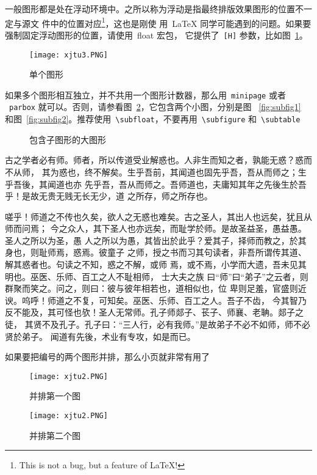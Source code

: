 \documentclass[%
               amsthm,
              ]{xjtubsc}
\begin{document}
一般图形都是处在浮动环境中。之所以称为浮动是指最终排版效果图形的位置不一定与源文
件中的位置对应\footnote{This is not a bug, but a feature of \LaTeX!}，这也是刚使
用~\LaTeX{} 同学可能遇到的问题。如果要强制固定浮动图形的位置，请使用~\textsf{float} 宏包，
它提供了~\texttt{[H]} 参数，比如图~\ref{fig:xfig1}。
\begin{figure}[H]
  \centering
  \texttt{[image: xjtu3.PNG]}
  \caption{单个图形}
  \label{fig:xfig1}
\end{figure}
如果多个图形相互独立，并不共用一个图形计数器，那么用~\verb|minipage| 或者
~\verb|parbox| 就可以。否则，请参看图~\ref{fig:big1}，它包含两个小图，分别是图
~\ref{fig:subfig1} 和图~\ref{fig:subfig2}。推荐使用~\verb|\subfloat|，不要再用~\verb|\subfigure|
和~\verb|\subtable|
\begin{figure}[h]
  \centering%
  \hspace{4em}%
  \caption{包含子图形的大图形}
  \label{fig:big1}
\end{figure}

古之学者必有师。师者，所以传道受业解惑也。人非生而知之者，孰能无惑？惑而不从师，
其为惑也，终不解矣。生乎吾前，其闻道也固先乎吾，吾从而师之；生乎吾後，其闻道也亦
先乎吾，吾从而师之。吾师道也，夫庸知其年之先後生於吾乎！是故无贵无贱无长无少，道
之所存，师之所存也。

嗟乎！师道之不传也久矣，欲人之无惑也难矣。古之圣人，其出人也远矣，犹且从师而问焉；
今之众人，其下圣人也亦远矣，而耻学於师。是故圣益圣，愚益愚。圣人之所以为圣，愚
人之所以为愚，其皆出於此乎？爱其子，择师而教之，於其身也，则耻师焉，惑焉。彼童子
之师，授之书而习其句读者，非吾所谓传其道、解其惑者也。句读之不知，惑之不解，或师
焉，或不焉，小学而大遗，吾未见其明也。巫医、乐师、百工之人不耻相师，  士大夫之族
曰“师”曰“弟子”之云者，则群聚而笑之。问之，则曰：彼与彼年相若也，道相似也，位
卑则足羞，官盛则近谀。呜呼！师道之不复，可知矣。巫医、乐师、百工之人。吾子不齿，
今其智乃反不能及，其可怪也欤！圣人无常师。孔子师郯子、苌子、师襄、老聃。郯子之徒，
其贤不及孔子。孔子曰：“三人行，必有我师。”是故弟子不必不如师，师不必贤於弟子。
闻道有先後，术业有专攻，如是而已。

如果要把编号的两个图形并排，那么小页就非常有用了
\begin{figure}[h]
\begin{minipage}{0.48\textwidth}
  \centering
  \texttt{[image: xjtu2.PNG]}
  \caption{并排第一个图}
  \label{fig:parallel1}
\end{minipage}\hfill
\begin{minipage}{0.48\textwidth}
  \centering
  \texttt{[image: xjtu2.PNG]}
  \caption{并排第二个图}
  \label{fig:parallel2}
\end{minipage}
\end{figure}
\end{document}
